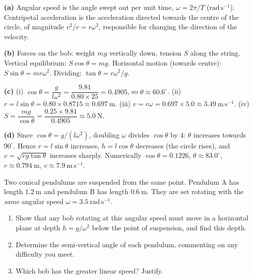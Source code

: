 \documentclass[11pt]{article}
\begin{document}
\begin{corrige}[Exercise 1]
\textbf{(a)} Angular speed is the angle swept out per unit time, $\omega = 2\pi/T$ ($\mathrm{rad\,s^{-1}}$). Centripetal acceleration is the acceleration directed towards the centre of the circle, of magnitude $v^{2}/r = r\omega^{2}$, responsible for changing the direction of the velocity.

\textbf{(b)} Forces on the bob: weight $mg$ vertically down, tension $S$ along the string. Vertical equilibrium: $S\cos\theta = mg$. Horizontal motion (towards centre): $S\sin\theta = mr\omega^{2}$. Dividing: $\tan\theta = r\omega^{2}/g$.

\textbf{(c)} (i) $\cos\theta = \dfrac{g}{l\omega^{2}} = \dfrac{9.81}{0.80 \times 25} = 0.4905$, so $\theta \approx 60.6^{\circ}$. (ii) $r = l\sin\theta = 0.80 \times 0.8715 \approx 0.697\ \mathrm{m}$. (iii) $v = r\omega = 0.697 \times 5.0 \approx 3.49\ \mathrm{m\,s^{-1}}$. (iv) $S = \dfrac{mg}{\cos\theta} = \dfrac{0.25 \times 9.81}{0.4905} \approx 5.0\ \mathrm{N}$.

\textbf{(d)} Since $\cos\theta = g/(l\omega^{2})$, doubling $\omega$ divides $\cos\theta$ by $4$: $\theta$ increases towards $90^{\circ}$. Hence $r = l\sin\theta$ increases, $h = l\cos\theta$ decreases (the circle rises), and $v = \sqrt{rg\tan\theta}$ increases sharply. Numerically $\cos\theta = 0.1226$, $\theta \approx 83.0^{\circ}$, $r \approx 0.794\ \mathrm{m}$, $v \approx 7.9\ \mathrm{m\,s^{-1}}$.
\end{corrige}

\begin{exercice}
Two conical pendulums are suspended from the same point. Pendulum A has length $1.2\ \mathrm{m}$ and pendulum B has length $0.6\ \mathrm{m}$. They are set rotating with the \emph{same} angular speed $\omega = 3.5\ \mathrm{rad\,s^{-1}}$.
\begin{enumerate}
\item Show that any bob rotating at this angular speed must move in a horizontal plane at depth $h = g/\omega^{2}$ below the point of suspension, and find this depth.
\item Determine the semi-vertical angle of each pendulum, commenting on any difficulty you meet.
\item Which bob has the greater linear speed? Justify.
\end{enumerate}
\end{exercice}
\end{document}
